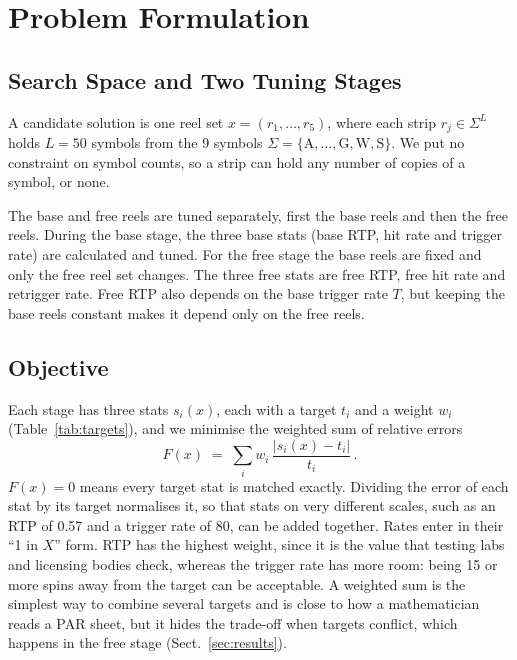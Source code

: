 \section{Problem Formulation}
\label{sec:problem}

\subsection{Search Space and Two Tuning Stages}
\label{sec:space}

A candidate solution is one reel set $x = (r_1, \dots, r_5)$, where each strip $r_j \in \Sigma^{L}$ holds $L = 50$ symbols from the 9 symbols $\Sigma = \{\mathrm{A}, \dots, \mathrm{G}, \mathrm{W}, \mathrm{S}\}$. We put no constraint on symbol counts, so a strip can hold any number of copies of a symbol, or none.

The base and free reels are tuned separately, first the base reels and then the free reels. During the base stage, the three base stats (base RTP, hit rate and trigger rate) are calculated and tuned. For the free stage the base reels are fixed and only the free reel set changes. The three free stats are free RTP, free hit rate and retrigger rate. Free RTP also depends on the base trigger rate $T$, but keeping the base reels constant makes it depend only on the free reels.

\subsection{Objective}
\label{sec:objective}

Each stage has three stats $s_i(x)$, each with a target $t_i$ and a weight $w_i$ (Table~\ref{tab:targets}), and we minimise the weighted sum of relative errors
\begin{equation}
  F(x) \;=\; \sum_{i} w_i \, \frac{\lvert s_i(x) - t_i \rvert}{t_i}\,.
  \label{eq:fitness}
\end{equation}
$F(x) = 0$ means every target stat is matched exactly. Dividing the error of each stat by its target normalises it, so that stats on very different scales, such as an RTP of 0.57 and a trigger rate of 80, can be added together. Rates enter in their ``1 in $X$'' form. RTP has the highest weight, since it is the value that testing labs and licensing bodies check, whereas the trigger rate has more room: being 15 or more spins away from the target can be acceptable. A weighted sum is the simplest way to combine several targets and is close to how a mathematician reads a PAR sheet, but it hides the trade-off when targets conflict, which happens in the free stage (Sect.~\ref{sec:results}).

